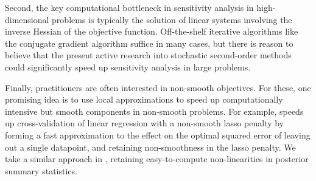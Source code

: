 Second, the key computational bottleneck in sensitivity analysis in
high-dimensional problems is typically the solution of linear systems involving
the inverse Hessian of the objective function. Off-the-shelf iterative
algorithms like the conjugate gradient algorithm %
suffice in many cases, but there is reason to believe that the present active
research into stochastic second-order methods
could significantly speed up sensitivity analysis in large problems.

Finally, practitioners are often interested in non-smooth objectives. For these,
one promising idea is to use local approximations to speed up computationally
intensive but smooth components in non-smooth problems. For example,
\citet{wilson:2020:approximatecv} speeds up cross-validation of linear
regression with a non-smooth lasso penalty by forming a fast approximation to
the effect on the optimal squared error of leaving out a single datapoint, and
retaining non-smoothness in the lasso penalty. We take a similar approach in
\citet{giordano:2021:bnpsensitivity}, retaining easy-to-compute non-linearities
in posterior summary statistics.

\newpage





